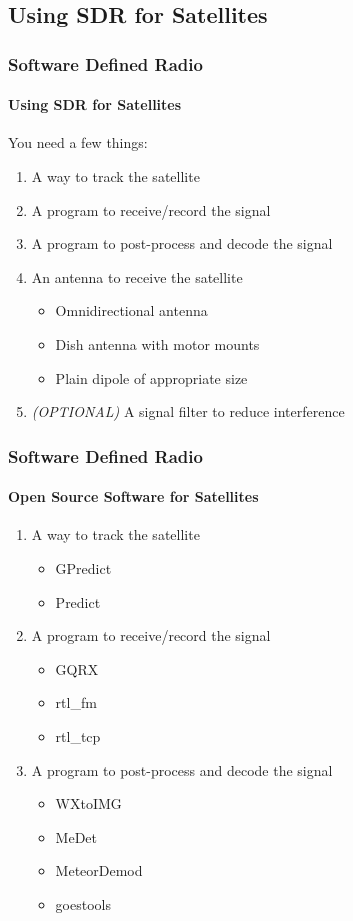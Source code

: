 \documentclass[]{beamer}
\begin{document}
\subsection{Using SDR for Satellites}
\begin{frame}
    \frametitle{Software Defined Radio}
    \framesubtitle{Using SDR for Satellites}
    You need a few things:
    \begin{enumerate}
        \item A way to track the satellite
        \item A program to receive/record the signal
        \item A program to post-process and decode the signal
        \item An antenna to receive the satellite
            \begin{itemize}
                \item Omnidirectional antenna
                \item Dish antenna with motor mounts
                \item Plain dipole of appropriate size
            \end{itemize}
        \item \emph{\textsc{(OPTIONAL)}} A signal filter to reduce interference
    \end{enumerate}
\end{frame}
\begin{frame}
    \frametitle{Software Defined Radio}
    \framesubtitle{Open Source Software for Satellites}
    \begin{enumerate}
        \item A way to track the satellite
            \begin{itemize}
                \item GPredict
                \item Predict
            \end{itemize}
        \item A program to receive/record the signal
            \begin{itemize}
                \item GQRX
                \item rtl\_fm
                \item rtl\_tcp
            \end{itemize}
        \item A program to post-process and decode the signal
            \begin{itemize}
                \item WXtoIMG
                \item MeDet
                \item MeteorDemod
                \item goestools
            \end{itemize}
    \end{enumerate}
\end{frame}
\end{document}
